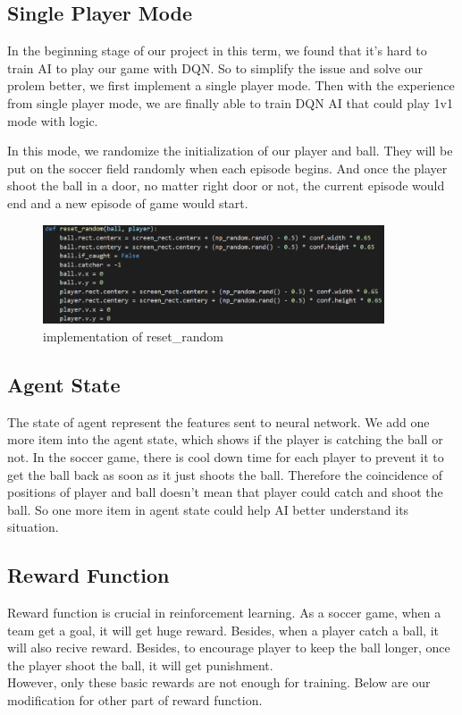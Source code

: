\documentclass[12pt]{article}
\begin{document}
\subsection{Single Player Mode}
In the beginning stage of our project in this term, we found that it's hard to train AI to play our game with DQN. So to simplify the issue and solve our prolem better, we first implement a single player mode. Then with the experience from single player mode, we are finally able to train DQN AI that could play 1v1 mode with logic.

In this mode, we randomize the initialization of our player and ball. They will be put on the soccer field randomly when each episode begins. And once the player shoot the ball in a door, no matter right door or not, the current episode would end and a new episode of game would start.
\begin{figure}[H]
	\begin{center}
		\includegraphics[width=0.9\textwidth]{reset_random}
		\caption{implementation of reset\_random}
	\end{center}
\end{figure}


\subsection{Agent State}
The state of agent represent the features sent to neural network. We add one more item into the agent state, which shows if the player is catching the ball or not. In the soccer game, there is cool down time for each player to prevent it to get the ball back as soon as it just shoots the ball. Therefore the coincidence of positions of player and ball doesn't mean that player could catch and shoot the ball. So one more item in agent state could help AI better understand its situation.


\subsection{Reward Function}
Reward function is crucial in reinforcement learning. As a soccer game, when a team get a goal, it will get huge reward. Besides, when a player catch a ball, it will also recive reward. Besides, to encourage player to keep the ball longer, once the player shoot the ball, it will get punishment.\\
However, only these basic rewards are not enough for training. Below are our modification for other part of reward function.
\end{document}
